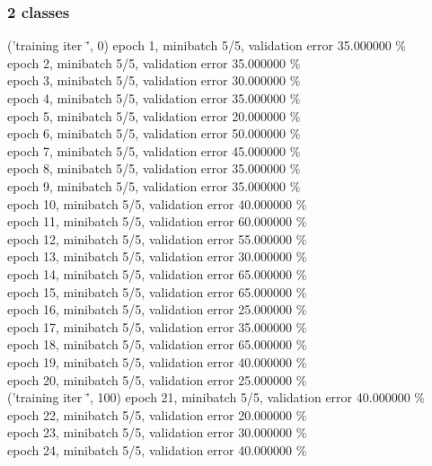 \documentclass[a4paper]{article}
\begin{document}
\subsubsection{2 classes}

('training \@ iter \= ', 0)
epoch 1, minibatch 5/5, validation error 35.000000 \% \\
epoch 2, minibatch 5/5, validation error 35.000000 \% \\
epoch 3, minibatch 5/5, validation error 30.000000 \% \\
epoch 4, minibatch 5/5, validation error 35.000000 \% \\
epoch 5, minibatch 5/5, validation error 20.000000 \% \\
epoch 6, minibatch 5/5, validation error 50.000000 \% \\
epoch 7, minibatch 5/5, validation error 45.000000 \% \\
epoch 8, minibatch 5/5, validation error 35.000000 \% \\
epoch 9, minibatch 5/5, validation error 35.000000 \% \\
epoch 10, minibatch 5/5, validation error 40.000000 \% \\
epoch 11, minibatch 5/5, validation error 60.000000 \% \\
epoch 12, minibatch 5/5, validation error 55.000000 \% \\
epoch 13, minibatch 5/5, validation error 30.000000 \% \\
epoch 14, minibatch 5/5, validation error 65.000000 \% \\
epoch 15, minibatch 5/5, validation error 65.000000 \% \\
epoch 16, minibatch 5/5, validation error 25.000000 \% \\
epoch 17, minibatch 5/5, validation error 35.000000 \% \\
epoch 18, minibatch 5/5, validation error 65.000000 \% \\
epoch 19, minibatch 5/5, validation error 40.000000 \% \\
epoch 20, minibatch 5/5, validation error 25.000000 \% \\
('training \@ iter \= ', 100)
epoch 21, minibatch 5/5, validation error 40.000000 \% \\
epoch 22, minibatch 5/5, validation error 20.000000 \% \\
epoch 23, minibatch 5/5, validation error 30.000000 \% \\
epoch 24, minibatch 5/5, validation error 40.000000 \% \\
\end{document}
